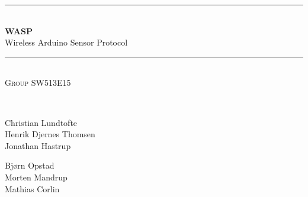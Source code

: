 \documentclass[pdftex,12pt,a4paper]{report}
\newcommand{\HRule}{\rule{\linewidth}{0.5mm}}
\begin{document}
\begin{titlepage}
\begin{center}


\HRule \\[0.4cm]
{ \huge{\bfseries WASP}\\ Wireless Arduino Sensor Protocol\\[0.4cm] }

\HRule \\[1.5cm]

\textsc{Group SW513E15}

\begin{figure}[!h]
	\centering
\end{figure}

\textsc{\Large }\\[0.5cm]

\begin{minipage}{0.4\textwidth}
\begin{flushleft} \large
Christian Lundtofte\\
Henrik Djernes Thomsen\\
Jonathan Hastrup\\
\end{flushleft}
\end{minipage}
\begin{minipage}{0.4\textwidth}
\begin{flushright} \large
Bjørn Opstad\\
Morten Mandrup\\
Mathias Corlin
\end{flushright}
\end{minipage}

\vfill

\end{center}
\end{titlepage}
\end{document}
